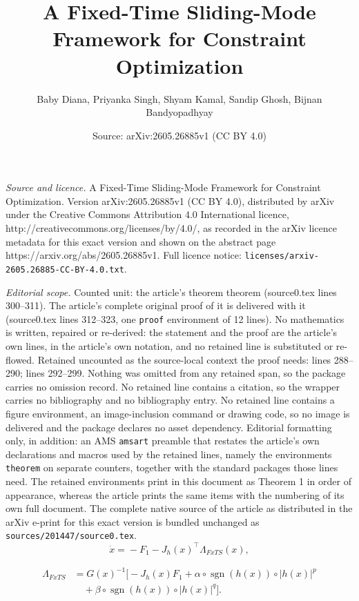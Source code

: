 \documentclass[10pt,a4paper]{amsart}
\title{A Fixed-Time Sliding-Mode Framework for Constraint Optimization}
\author{Baby Diana, Priyanka Singh, Shyam Kamal, Sandip Ghosh, Bijnan Bandyopadhyay}
\date{Source: arXiv:2605.26885v1 (CC BY 4.0)}
\begin{document}
\maketitle

\noindent\emph{Source and licence.} A Fixed-Time Sliding-Mode Framework for Constraint Optimization. Version arXiv:2605.26885v1 (CC BY 4.0), distributed by arXiv under the Creative Commons Attribution 4.0 International licence, http://creativecommons.org/licenses/by/4.0/, as recorded in the arXiv licence metadata for this exact version and shown on the abstract page https://arxiv.org/abs/2605.26885v1. Full licence notice: \texttt{licenses/arxiv-2605.26885-CC-BY-4.0.txt}.\par\smallskip

\noindent\textit{Editorial scope.} Counted unit: the article's theorem theorem (source0.tex lines 300--311). The article's complete original proof of it is delivered with it (source0.tex lines 312--323, one \texttt{proof} environment of 12 lines). No mathematics is written, repaired or re-derived: the statement and the proof are the article's own lines, in the article's own notation, and no retained line is substituted or re-flowed.  Retained uncounted as the source-local context the proof needs: lines 288--290; lines 292--299.  Nothing was omitted from any retained span, so the package carries no omission record.  No retained line contains a citation, so the wrapper carries no bibliography and no bibliography entry.  No retained line contains a figure environment, an image-inclusion command or drawing code, so no image is delivered and the package declares no asset dependency.  Editorial formatting only, in addition: an AMS \texttt{amsart} preamble that restates the article's own declarations and macros used by the retained lines, namely the environments \texttt{theorem} on separate counters, together with the standard packages those lines need.  The retained environments print in this document as Theorem 1 in order of appearance, whereas the article prints the same items with the numbering of its own full document.  The complete native source of the article as distributed in the arXiv e-print for this exact version is bundled unchanged as \texttt{sources/201447/source0.tex}.
\begin{equation} \label{eq:fxgf_smc}
 \dot{x}=\!\!-F_1-\!J_h(x)^\top\! \Lambda_{FxTS}(x),   
\end{equation}

\begin{equation} \label{eq: fxts_1}
\begin{aligned}
\Lambda_{FxTS}
&= G(x)^{-1}\Big[-J_h(x)F_1 +\alpha \circ \operatorname{sgn}(h(x)) \circ |h(x)|^{p}\\
&\quad+ \beta \circ \operatorname{sgn}(h(x)) \circ |h(x)|^{q}
\Big].
\end{aligned}
\end{equation}
\end{document}
